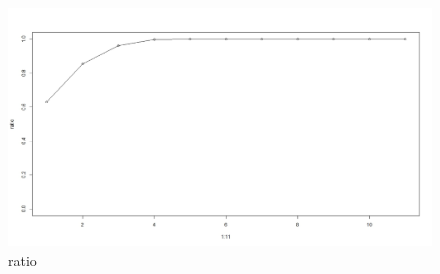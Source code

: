 \documentclass{article}
\begin{document}
  \begin{figure}[H]
  \centering
  \includegraphics[width=1.0\textwidth]{ratio.jpg}
  \caption{ratio}\label{}
  \end{figure}
\end{document}

